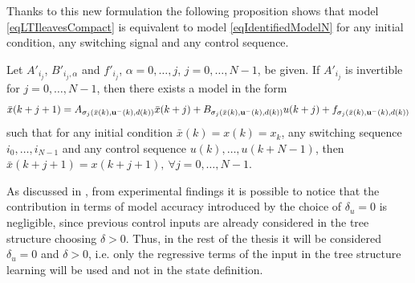 Thanks to this new formulation the following proposition shows that model \eqref{eqLTIleavesCompact} is equivalent to model \eqref{eqIdentifiedModelN} for any initial condition, any switching signal and any control sequence.
\begin{proposition}\label{propSwitchingSystem}\cite{smarraNAHS2020}
	Let $A'_{i_j}$, $B'_{i_j,\alpha}$ and $f'_{i_j}$, $\alpha=0,\ldots,j$, $j=0,\ldots,N-1$, be given. If $A'_{i_j}$ is invertible for $j=0,\ldots,N-1$, then there exists a model in the form
	\vspace{-0.2cm}
	\begin{equation*}
	\bar x({k+j+1}) = A_{\sigma_j(\bar x(k),\bold{u^-}(k), d(k))} \bar x({k+j})+B_{\sigma_j(\bar x(k),\bold{u^-}(k), d(k))} u({k+j})+ f_{\sigma_j(\bar x(k),\bold{u^-}(k), d(k))}	
	\end{equation*}
	such that for any initial condition $\bar x(k) = x(k) = x_k$, any switching sequence $i_0, \ldots, i_{N-1}$ and any control sequence $u(k),\ldots,u(k+N-1)$, then $\bar x(k+j+1) = x(k+j+1),\ \forall j=0,\ldots,N-1$.
\end{proposition}

As discussed in \cite{smarraNAHS2020}, from experimental findings it is possible to notice that the contribution in terms of model accuracy introduced by the choice of $\delta_u = 0$ is negligible, since previous control inputs are already considered in the tree structure choosing $\delta > 0$. Thus, in the rest of the thesis it will be considered $\delta_u = 0$ and $\delta > 0$, i.e. only the regressive terms of the input in the tree structure learning will be used and not in the state definition.

